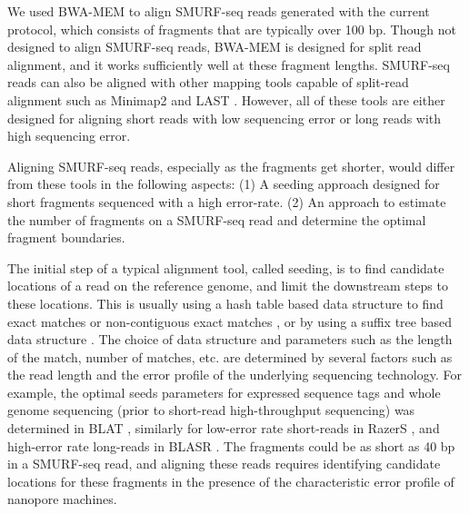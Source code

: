 We used BWA-MEM \citep{li2013aligning} to align SMURF-seq reads generated
with the current protocol, which consists of fragments that are
typically over 100 bp. Though not designed to align SMURF-seq reads,
BWA-MEM is designed for split read alignment, and it works sufficiently
well at these fragment lengths.  SMURF-seq reads can also be aligned
with other mapping tools capable of split-read alignment such as
Minimap2 \citep{li2018minimap2} and LAST \citep{kielbasa2011adaptive}.
However, all of these tools are either designed for aligning short reads
with low sequencing error or long reads with high sequencing error.

Aligning SMURF-seq reads, especially as the fragments get shorter,
would differ from these tools in the following aspects: (1) A seeding
approach designed for short fragments sequenced with a high error-rate.
(2) An approach to estimate the number of fragments on a SMURF-seq read
and determine the optimal fragment boundaries.

The initial step of a typical alignment tool, called seeding, is to find
candidate locations of a read on the reference genome, and limit the
downstream steps to these locations.
%
This is usually using a hash table based data structure to find exact
matches \citep{altschul1990basic,altschul1997gapped,kent2002blat} or
non-contiguous exact matches \citep{ma2002patternhunter,chen2009perm},
or by using a suffix tree based data structure
\citep{kurtz2004versatile,langmead2009ultrafast,li2009fast,
li2010fast,li2013aligning}.
%
The choice of data structure and parameters such as the length of the
match, number of matches, etc. are determined by several factors such
as the read length and the error profile of the underlying sequencing
technology.
%
For example, the optimal seeds parameters for expressed sequence tags
and whole genome sequencing (prior to short-read high-throughput
sequencing) was determined in BLAT \citep{kent2002blat}, similarly for
low-error rate short-reads in RazerS \citep{weese2009razers}, and
high-error rate long-reads in BLASR \citep{chaisson2012mapping}.
%
The fragments could be as short as 40 bp in a SMURF-seq read, and
aligning these reads requires identifying candidate locations for these
fragments in the presence of the characteristic error profile of
nanopore machines.


